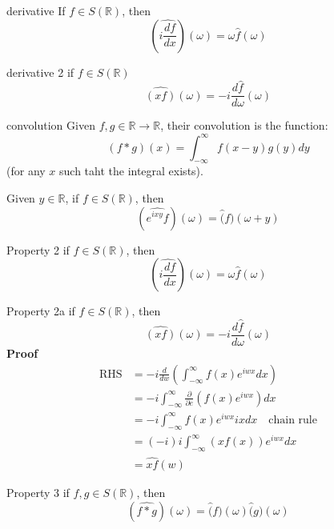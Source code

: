 \documentclass[a4paper]{article}
\newcommand{\R}{\mathbb{R}}
\begin{document}
\begin{Corollary}{derivative}{}
	If $f \in S(\R)$, then \[
	\left(\widehat{i \frac{d f}{d x}}\right)(\omega)=\omega \hat{f}(\omega)
	\] 
\end{Corollary}

\begin{Corollary}{derivative 2}{}
	if $f \in S(\R)$ \[
	\widehat{(x f)}(\omega)=-i \frac{d \hat{f}}{d \omega}(\omega)
\]
\end{Corollary}

\begin{Definition}{convolution}{}
	Given $f,g \in \R \to \R$, their convolution is the function: \[
	(f * g)(x)=\int_{-\infty}^{\infty} f(x-y) g(y) d y
\] (for any $x $ such taht the integral exists).
\end{Definition}

\begin{Corollary}{}{}
	Given  $y \in \R$, if $f \in S(\R)$, then \[
		\left( \widehat{e^{ixy} f} \right) \left( \omega \right) = \widehat(f) \left( \omega + y \right) 
	\] 
\end{Corollary}

\begin{Corollary}{Property 2}{}
	if $f \in S(\R)$, then \[
	\left(\widehat{i \frac{d f}{d x}}\right)(\omega)=\omega \hat{f}(\omega)
	\] 
\end{Corollary}

\begin{Corollary}{Property 2a}{}
	if $f \in S(\R)$, then \[
	\widehat{(x f)}(\omega)=-i \frac{d \hat{f}}{d \omega}(\omega)
	\]
\tcblower
\textbf{Proof}
\begin{align*}
	\text{RHS} &= -i \frac{d}{dw}\left( \int_{-\infty}^{\infty} f(x) e^{iwx} dx \right)\\
		   &= -i \int_{-\infty}^{\infty} \frac{\partial}{\partial e} \left( f(x) e ^{iwx} \right) dx \\
		   &= -i \int_{-\infty}^{\infty} f(x) e^{iwx}ix dx  \quad \text{chain rule} \\
		   &= (-i)i \int_{-\infty}^{\infty} \left( x f(x) \right) e^{iwx} dx \\
		   &= \widehat{xf}(w)
\end{align*}
\end{Corollary}

\begin{Corollary}{Property 3}{}
	if $f, g \in S(\R)$, then \[
		\left( \widehat{f * g} \right) \left( \omega \right) = \hat(f)(\omega)\hat(g)(\omega) 
	\] 
\end{Corollary}
\end{document}
